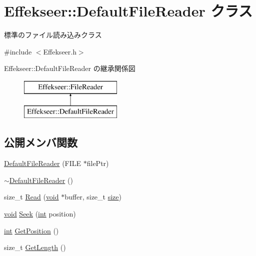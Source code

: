 \hypertarget{class_effekseer_1_1_default_file_reader}{}\section{Effekseer\+:\+:Default\+File\+Reader クラス}
\label{class_effekseer_1_1_default_file_reader}


標準のファイル読み込みクラス  




{\ttfamily \#include $<$Effekseer.\+h$>$}

Effekseer\+:\+:Default\+File\+Reader の継承関係図\begin{figure}[H]
\begin{center}
\leavevmode
\includegraphics[height=2.000000cm]{class_effekseer_1_1_default_file_reader}
\end{center}
\end{figure}
\subsection*{公開メンバ関数}
\begin{DoxyCompactItemize}
\item 
\mbox{\hyperlink{class_effekseer_1_1_default_file_reader_ad8f7324f6217658c9f3ec1c6db5f9e6b}{Default\+File\+Reader}} (F\+I\+LE $\ast$file\+Ptr)
\item 
\mbox{\hyperlink{class_effekseer_1_1_default_file_reader_adcc437133a5e54acf884fd867d243c96}{$\sim$\+Default\+File\+Reader}} ()
\item 
size\+\_\+t \mbox{\hyperlink{class_effekseer_1_1_default_file_reader_ae00fd8b1031e13bd5a43d74f03d7ed79}{Read}} (\mbox{\hyperlink{namespace_effekseer_ab34c4088e512200cf4c2716f168deb56}{void}} $\ast$buffer, size\+\_\+t \mbox{\hyperlink{namespace_effekseer_a73c68f3d33539d30844b9d1e058077f7}{size}})
\item 
\mbox{\hyperlink{namespace_effekseer_ab34c4088e512200cf4c2716f168deb56}{void}} \mbox{\hyperlink{class_effekseer_1_1_default_file_reader_a9c9e821e4508708a2c91a9ab486b2709}{Seek}} (\mbox{\hyperlink{namespace_effekseer_ace0abf7c2e6947e519ebe8b54cbcc30a}{int}} position)
\item 
\mbox{\hyperlink{namespace_effekseer_ace0abf7c2e6947e519ebe8b54cbcc30a}{int}} \mbox{\hyperlink{class_effekseer_1_1_default_file_reader_a86001f21782b7cb40a5e0ca4ee155aca}{Get\+Position}} ()
\item 
size\+\_\+t \mbox{\hyperlink{class_effekseer_1_1_default_file_reader_a2663a6f3b6bf3aaabadcfe371a85b15d}{Get\+Length}} ()
\end{DoxyCompactItemize}


